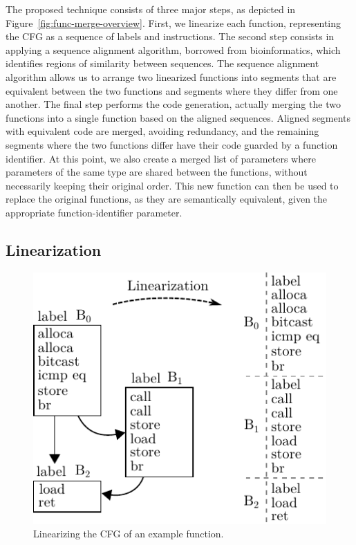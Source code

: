 The proposed technique consists of three major steps, as depicted in
Figure~\ref{fig:func-merge-overview}.
First, we linearize each function, representing the CFG as a sequence of
labels and instructions.
The second step consists in applying a sequence alignment algorithm, borrowed
from bioinformatics, which identifies regions of similarity between sequences.
The sequence alignment algorithm allows us to arrange two linearized functions
into segments that are equivalent between the two functions and segments where
they differ from one another.
The final step performs the code generation, actually merging the two functions
into a single function based on the aligned sequences.
Aligned segments with equivalent code are merged, avoiding redundancy, %
and the remaining segments where the two functions differ have their code guarded by a function identifier. At this point, we also create a
merged list of parameters where parameters of the same type are shared between the functions, without necessarily keeping their original
order. This new function can then be used to replace the original functions, as they are semantically equivalent, given the appropriate
function-identifier parameter.

\subsection{Linearization}

\begin{figure}[t!]
  \centering
  \includegraphics[width=0.7\linewidth]{figs/linearization-example.pdf}
  \caption{Linearizing the CFG of an example function.}
  \label{fig:linearization-example}
\end{figure}

